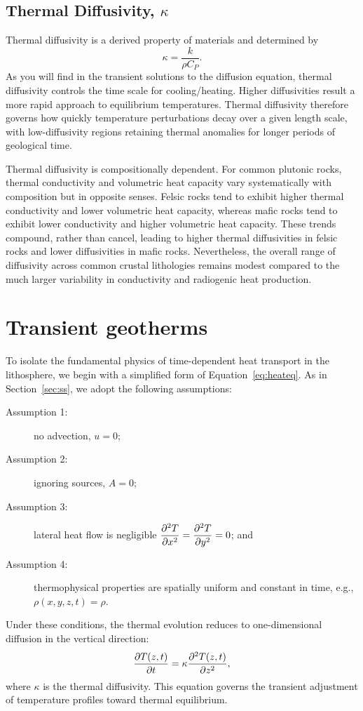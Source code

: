 \subsection{Thermal Diffusivity, $\kappa$}
Thermal diffusivity is a derived property of materials and determined by
\begin{equation}
    \kappa = \frac{k}{\rho C_P}.
\end{equation}
As you will find in the transient solutions to the diffusion equation, thermal diffusivity controls the time scale for cooling/heating.  Higher diffusivities result a more rapid approach to equilibrium temperatures.  Thermal diffusivity therefore governs how quickly temperature perturbations decay over a given length scale, with low-diffusivity regions retaining thermal anomalies for longer periods of geological time.

Thermal diffusivity is compositionally dependent.  For common plutonic rocks, thermal conductivity and volumetric heat capacity vary systematically with composition but in opposite senses. Felsic rocks tend to exhibit higher thermal conductivity and lower volumetric heat capacity, whereas mafic rocks tend to exhibit lower conductivity and higher volumetric heat capacity. These trends compound, rather than cancel, leading to higher thermal diffusivities in felsic rocks and lower diffusivities in mafic rocks. Nevertheless, the overall range of diffusivity across common crustal lithologies remains modest compared to the much larger variability in conductivity and radiogenic heat production.  

\section{Transient geotherms}

To isolate the fundamental physics of time-dependent heat transport in the lithosphere, we begin with a simplified form of Equation~\ref{eq:heateq}. As in Section~\ref{sec:ss}, we adopt the following assumptions:
\begin{description}
    \item[Assumption 1:] no advection, $u = 0$;
    \item[Assumption 2:] ignoring sources, $A = 0$;
    \item[Assumption 3:] lateral heat flow is negligible $\displaystyle \pdv[2]{T}{x} = \pdv[2]{T}{y} = 0$; and
    \item[Assumption 4:] thermophysical properties are spatially uniform and constant in time, e.g., $\rho(x,y,z,t) = \rho$.
\end{description}
Under these conditions, the thermal evolution reduces to one-dimensional diffusion in the vertical direction:
\begin{equation}
    \pdv{T(z,t)}{t} = \kappa \pdv[2]{T(z,t)}{z},
\end{equation}
where $\kappa$ is the thermal diffusivity. This equation governs the transient adjustment of temperature profiles toward thermal equilibrium.

